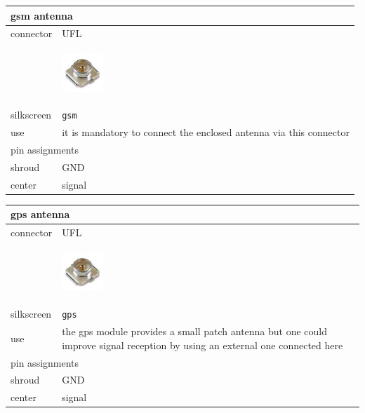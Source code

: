 \documentclass[a4paper,twoside]{refart}
\begin{document}
\begin{tabular}{ |l|p{8cm}| }
    \hline
    \multicolumn{2}{|l|}{gsm antenna} \\
    \hline
        connector & UFL \\
         & \begin{center} \includegraphics[height=40pt]{img/ufl} \end{center} \\ \hline
        silkscreen & \verb"gsm" \\ \hline
        use & it is mandatory to connect the enclosed antenna via this connector \\
    \hline
    \multicolumn{2}{|l|}{pin assignments} \\
    \hline
        shroud   &   GND \\
        center   &   signal \\
    \hline
\end{tabular}

\begin{tabular}{ |l|p{8cm}| }
    \hline
    \multicolumn{2}{|l|}{gps antenna} \\
    \hline
        connector & UFL \\
         & \begin{center} \includegraphics[height=40pt]{img/ufl} \end{center} \\ \hline
        silkscreen & \verb"gps" \\ \hline
        use & the gps module provides a small patch antenna but one could improve signal reception by using an external one connected here\\
    \hline
    \multicolumn{2}{|l|}{pin assignments} \\
    \hline
        shroud   &   GND \\
        center   &   signal \\
    \hline
\end{tabular}

\newpage


\printglossaries



\end{document}
